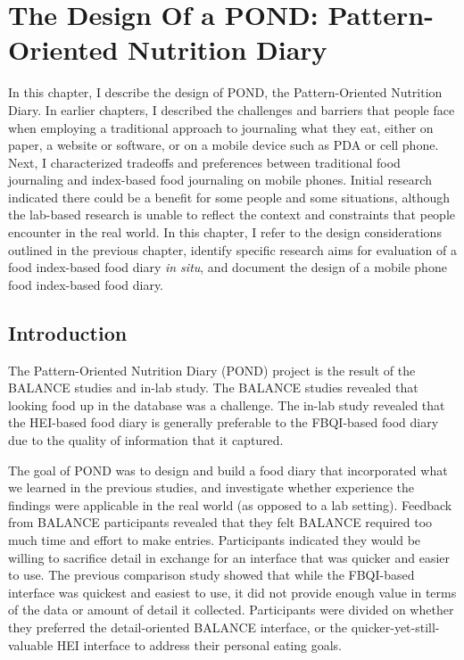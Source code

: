 
\chapter{The Design Of a POND: Pattern-Oriented Nutrition Diary}
\label{cha:cont3}
 

In this chapter, I describe the design of POND, the Pattern-Oriented Nutrition Diary. In earlier chapters, I described the challenges and barriers that people face when employing a traditional approach to journaling what they eat, either on paper, a website or software, or on a mobile device such as PDA or cell phone. Next, I characterized tradeoffs and preferences between traditional food journaling and index-based food journaling on mobile phones. Initial research indicated there could be a benefit for some people and some situations, although the lab-based research is unable to reflect the context and constraints that people encounter in the real world. In this chapter, I refer to the design considerations outlined in the previous chapter, identify specific research aims for evaluation of a food index-based food diary \textit{in situ}, and document the design of a mobile phone food index-based food diary. 

\section{Introduction}
The Pattern-Oriented Nutrition Diary (POND) project is the result of the BALANCE studies and in-lab study. The BALANCE studies revealed that looking food up in the database was a challenge. The in-lab study revealed that the HEI-based food diary is generally preferable to the FBQI-based food diary due to the quality of information that it captured. 

The goal of POND was to design and build a food diary that incorporated what we learned in the previous studies, and investigate whether experience the findings were applicable in the real world (as opposed to a lab setting). Feedback from BALANCE participants revealed that they felt BALANCE required too much time and effort to make entries. Participants indicated they would be willing to sacrifice detail in exchange for an interface that was quicker and easier to use. The previous comparison study showed that while the FBQI-based interface was quickest and easiest to use, it did not provide enough value in terms of the data or amount of detail it collected. Participants were divided on whether they preferred the detail-oriented BALANCE interface, or the quicker-yet-still-valuable HEI interface to address their personal eating goals. 

